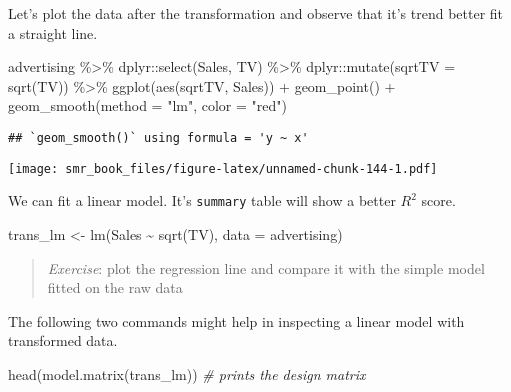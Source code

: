 \documentclass[
  oneside]{book}
\newenvironment{Shaded}{\begin{snugshade}}{\end{snugshade}}
\newcommand{\AttributeTok}[1]{\textcolor[rgb]{0.77,0.63,0.00}{#1}}
\newcommand{\CommentTok}[1]{\textcolor[rgb]{0.56,0.35,0.01}{\textit{#1}}}
\newcommand{\FunctionTok}[1]{\textcolor[rgb]{0.00,0.00,0.00}{#1}}
\newcommand{\NormalTok}[1]{#1}
\newcommand{\OtherTok}[1]{\textcolor[rgb]{0.56,0.35,0.01}{#1}}
\newcommand{\SpecialCharTok}[1]{\textcolor[rgb]{0.00,0.00,0.00}{#1}}
\newcommand{\StringTok}[1]{\textcolor[rgb]{0.31,0.60,0.02}{#1}}
\begin{document}
Let's plot the data after the transformation and observe
that it's trend better fit a straight line.

\begin{Shaded}
\begin{Highlighting}[]
\NormalTok{advertising }\SpecialCharTok{\%\textgreater{}\%}
\NormalTok{  dplyr}\SpecialCharTok{::}\FunctionTok{select}\NormalTok{(Sales, TV) }\SpecialCharTok{\%\textgreater{}\%}
\NormalTok{  dplyr}\SpecialCharTok{::}\FunctionTok{mutate}\NormalTok{(}\AttributeTok{sqrtTV =} \FunctionTok{sqrt}\NormalTok{(TV)) }\SpecialCharTok{\%\textgreater{}\%}
  \FunctionTok{ggplot}\NormalTok{(}\FunctionTok{aes}\NormalTok{(sqrtTV, Sales)) }\SpecialCharTok{+}
  \FunctionTok{geom\_point}\NormalTok{() }\SpecialCharTok{+}
  \FunctionTok{geom\_smooth}\NormalTok{(}\AttributeTok{method =} \StringTok{"lm"}\NormalTok{, }\AttributeTok{color =} \StringTok{"red"}\NormalTok{)}
\end{Highlighting}
\end{Shaded}

\begin{verbatim}
## `geom_smooth()` using formula = 'y ~ x'
\end{verbatim}

\texttt{[image: smr\_book\_files/figure-latex/unnamed-chunk-144-1.pdf]}

We can fit a linear model. It's \texttt{summary} table
will show a better \(R^2\) score.

\begin{Shaded}
\begin{Highlighting}[]
\NormalTok{trans\_lm }\OtherTok{\textless{}{-}} \FunctionTok{lm}\NormalTok{(Sales }\SpecialCharTok{\textasciitilde{}} \FunctionTok{sqrt}\NormalTok{(TV), }\AttributeTok{data =}\NormalTok{ advertising)}
\end{Highlighting}
\end{Shaded}

\begin{quote}
\emph{Exercise}: plot the regression line and compare it with
the simple model fitted on the raw data
\end{quote}

The following two commands might help in inspecting
a linear model with transformed data.

\begin{Shaded}
\begin{Highlighting}[]
\FunctionTok{head}\NormalTok{(}\FunctionTok{model.matrix}\NormalTok{(trans\_lm)) }\CommentTok{\# prints the design matrix}
\end{Highlighting}
\end{Shaded}
\end{document}
